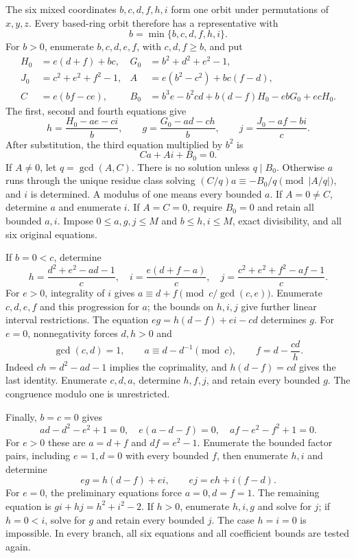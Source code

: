 The six mixed coordinates $b,c,d,f,h,i$ form one orbit under
permutations of $x,y,z$. Every based-ring orbit therefore has a
representative with
\[
 b=\min\{b,c,d,f,h,i\}.
\]
For $b>0$, enumerate $b,c,d,e,f$, with $c,d,f\geq b$, and put
\begin{align*}
 H_0&=e(d+f)+bc,&G_0&=b^2+d^2+e^2-1,\\
 J_0&=c^2+e^2+f^2-1,&
 A&=e(b^2-c^2)+bc(f-d),\\
 C&=e(bf-ce),&
 B_0&=b^3e-b^2cd+b(d-f)H_0-ebG_0+ecH_0.
\end{align*}
The first, second and fourth equations give
\[
 h=\frac{H_0-ae-ci}{b},\qquad
 g=\frac{G_0-ad-ch}{b},\qquad
 j=\frac{J_0-af-bi}{c}.
\]
After substitution, the third equation multiplied by $b^2$ is
\begin{equation}\label{eq:census-linear}
 Ca+Ai+B_0=0.
\end{equation}
If $A\ne0$, let $q=\gcd(A,C)$. There is no solution unless $q\mid B_0$.
Otherwise $a$ runs through the unique residue class solving
$(C/q)a\equiv-B_0/q\pmod{|A/q|}$, and $i$ is determined.
A modulus of one means every bounded $a$. If $A=0\ne C$, determine
$a$ and enumerate $i$. If $A=C=0$, require $B_0=0$ and retain all bounded
$a,i$. Impose $0\leq a,g,j\leq M$ and $b\leq h,i\leq M$,
exact divisibility, and all six original equations.

If $b=0<c$, determine
\[
 h=\frac{d^2+e^2-ad-1}{c},\quad
 i=\frac{e(d+f-a)}c,\quad
 j=\frac{c^2+e^2+f^2-af-1}c.
\]
For $e>0$, integrality of $i$ gives
$a\equiv d+f\pmod{c/\gcd(c,e)}$. Enumerate $c,d,e,f$ and this
progression for $a$; the bounds on $h,i,j$ give further linear interval
restrictions. The equation $eg=h(d-f)+ei-cd$ determines $g$.
For $e=0$, nonnegativity forces $d,h>0$ and
\[
 \gcd(c,d)=1,\qquad a\equiv d-d^{-1}\pmod c,\qquad
 f=d-\frac{cd}{h}.
\]
Indeed $ch=d^2-ad-1$ implies the coprimality, and $h(d-f)=cd$
gives the last identity. Enumerate $c,d,a$, determine $h,f,j$, and
retain every bounded $g$. The congruence modulo one is unrestricted.

Finally, $b=c=0$ gives
\[
 ad-d^2-e^2+1=0,\quad e(a-d-f)=0,\quad af-e^2-f^2+1=0.
\]
For $e>0$ these are $a=d+f$ and $df=e^2-1$. Enumerate the bounded
factor pairs, including $e=1,d=0$ with every bounded $f$, then enumerate
$h,i$ and determine
\[
 eg=h(d-f)+ei,\qquad ej=eh+i(f-d).
\]
For $e=0$, the preliminary equations force $a=0,d=f=1$. The remaining
equation is $gi+hj=h^2+i^2-2$. If $h>0$, enumerate $h,i,g$ and solve
for $j$; if $h=0<i$, solve for $g$ and retain every bounded $j$.
The case $h=i=0$ is impossible. In every branch, all six equations and
all coefficient bounds are tested again.

